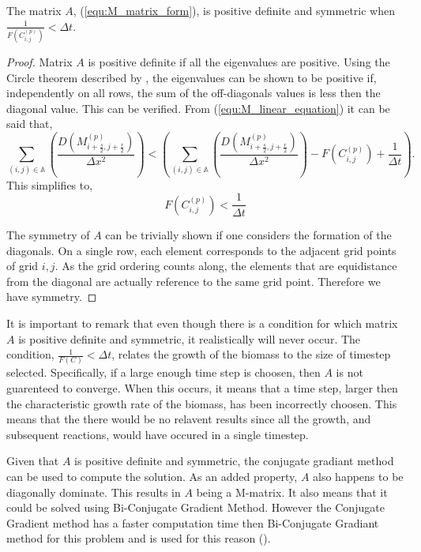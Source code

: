 \begin{prop}
  The matrix $A$, (\ref{equ:M_matrix_form}), is positive definite and symmetric when $\frac{1}{ F(C^{(p)}_{i,j}) } < \Delta t$.
\end{prop}
\begin{proof}
  Matrix $A$ is positive definite if all the eigenvalues are positive. 
  Using the Circle theorem described by \cite{gerschgorin1931uber_die_abgrenzung}, the eigenvalues can be shown to be positive if, independently on all rows, the sum of the off-diagonals values is less then the diagonal value.
  This can be verified. From (\ref{equ:M_linear_equation}) it can be said that,
  \begin{equation}
    \sum_{(i,j) \in \mathbb{A}} \left( \frac{D( M^{(p)}_{i+\frac{s}{2}, j+\frac{r}{2}} )}{\Delta x^2} \right)
     < \left( \sum_{(i,j) \in \mathbb{A}} \left( \frac{D( M^{(p)}_{i+\frac{s}{2}, j+\frac{r}{2}} )}{\Delta x^2} \right) 
    - F(C^{(p)}_{i,j}) + \frac{1}{\Delta t} \right). 
  \end{equation}
  This simplifies to,
  \begin{equation}
    F(C^{(p)}_{i,j}) < \frac{1}{\Delta t}
  \end{equation}

  The symmetry of $A$ can be trivially shown if one considers the formation of the diagonals.
  On a single row, each element corresponds to the adjacent grid points of grid $i,j$.
  As the grid ordering counts along, the elements that are equidistance from the diagonal are actually reference to the same grid point. 
  Therefore we have symmetry. 
\end{proof} 

It is important to remark that even though there is a condition for which matrix $A$ is positive definite and symmetric, it realistically will never occur.
The condition, $\frac{1}{F(C)} < \Delta t$, relates the growth of the biomass to the size of timestep selected.
Specifically, if a large enough time step is choosen, then $A$ is not guarenteed to converge.
When this occurs, it means that a time step, larger then the characteristic growth rate of the biomass, has been incorrectly choosen.
This means that the there would be no relavent results since all the growth, and subsequent reactions, would have occured in a single timestep.

Given that $A$ is positive definite and symmetric, the conjugate gradiant method can be used to compute the solution.
As an added property, $A$ also happens to be diagonally dominate.
This results in $A$ being a M-matrix.
It also means that it could be solved using Bi-Conjugate Gradient Method.
However the Conjugate Gradient method has a faster computation time then Bi-Conjugate Gradiant method for this problem and is used for this reason (\cite{barret1987templates}).


